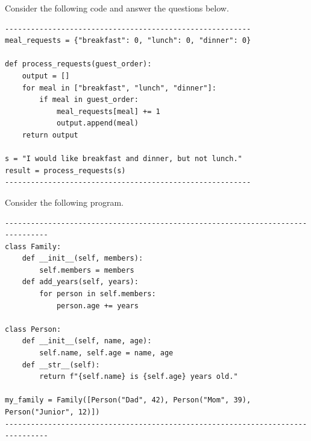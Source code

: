 \documentclass[12pt]{exam}
\begin{document}
\begin{questions}
\question[6] Consider the following code and answer the questions below.  


\begin{verbatim}
---------------------------------------------------------
meal_requests = {"breakfast": 0, "lunch": 0, "dinner": 0}

def process_requests(guest_order):
    output = []
    for meal in ["breakfast", "lunch", "dinner"]:
        if meal in guest_order:
            meal_requests[meal] += 1
            output.append(meal) 
    return output

s = "I would like breakfast and dinner, but not lunch."
result = process_requests(s)
---------------------------------------------------------
\end{verbatim}




\newpage

\question[10] Consider the following program. 
\begin{verbatim}
--------------------------------------------------------------------------------
class Family:
    def __init__(self, members):
        self.members = members
    def add_years(self, years):
        for person in self.members:
            person.age += years

class Person:
    def __init__(self, name, age):
        self.name, self.age = name, age
    def __str__(self):
        return f"{self.name} is {self.age} years old."

my_family = Family([Person("Dad", 42), Person("Mom", 39), Person("Junior", 12)])
--------------------------------------------------------------------------------
\end{verbatim}

\end{questions}
\end{document}
